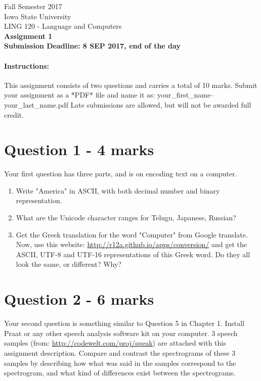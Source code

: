 \documentclass[11pt,a4paper]{article}
\begin{document}
\begin{center}
  Fall Semester 2017 \\ Iowa State University\\[3ex]
  {\large LING 120 - Language and Computers}\\[3ex]
  \textbf{Assignment 1} \\ \textbf{Submission Deadline: 8 SEP 2017, end of the day}
\end{center}


\paragraph{Instructions:} This assignment consists of two questions and carries a total of 10 marks. Submit your assignment as a *PDF* file and name it as: your\_first\_name--your\_last\_name.pdf Late submissions are allowed, but will not be awarded full credit.

\section*{Question 1 - 4 marks} 
Your first question has three parts, and is on encoding text on a computer.
\begin{enumerate}
\item Write "America" in ASCII, with both decimal number and binary representation.
\item What are the Unicode character ranges for Telugu, Japanese, Russian?
\item Get the Greek translation for the word "Computer" from Google translate. Now, use this website: \url{http://r12a.github.io/apps/conversion/}
and get the ASCII, UTF-8 and UTF-16 representations of this Greek word. Do they all look the same, or different? Why?
\end{enumerate}

\section*{Question 2 - 6 marks}
Your second question is something similar to Question 5 in Chapter 1. Install Praat or any other speech analysis software kit on your computer. 3 speech samples (from: \url{http://codewelt.com/proj/speak}) are attached with this assignment description. Compare and contrast the spectrograms of these 3 samples by describing how what was said in the samples correspond to the spectrogram, and what kind of differences exist between the spectrograms.
\end{document}
